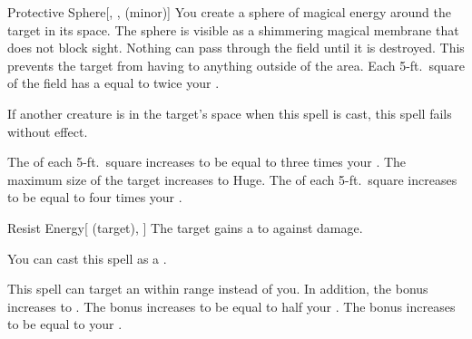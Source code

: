 \lowercase{\hypertarget{spell:Protective Sphere}{}}\label{spell:Protective Sphere}
\begin{freeability}[Rank 1]{\hypertarget{spell:Protective Sphere}{Protective Sphere}}[, ,  (minor)]
You create a sphere of magical energy around the target in its space.
The sphere is visible as a shimmering magical membrane that does not block sight.
Nothing can pass through the field until it is destroyed.
This prevents the target from having  to anything outside of the area.
Each 5-ft.\ square of the field has a  equal to twice your .

If another creature is in the target's space when this spell is cast, this spell fails without effect.

\rankline
{} The  of each 5-ft.\ square increases to be equal to three times your .
 The maximum size of the target increases to Huge.
 The  of each 5-ft.\ square increases to be equal to four times your .

\end{freeability}
\vspace{0.25em}



\lowercase{\hypertarget{spell:Resist Energy}{}}\label{spell:Resist Energy}
\begin{attuneability}[Rank 1]{\hypertarget{spell:Resist Energy}{Resist Energy}}[ (target), ]
The target gains a   to  against  damage.

You can cast this spell as a .

\rankline
{} This spell can target an  within \rngmed range instead of you.
In addition, the bonus increases to .
 The bonus increases to be equal to half your .
 The bonus increases to be equal to your .

\end{attuneability}
\vspace{0.25em}



